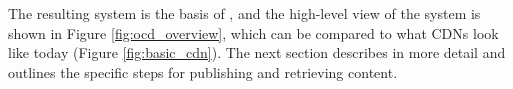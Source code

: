 The resulting system is the basis of \system{}, and the high-level view of the system is shown in Figure \ref{fig:ocd_overview}, 
which can be compared to what CDNs look like today (Figure \ref{fig:basic_cdn}).  The next section describes \system{} in more 
detail and outlines the specific steps for publishing and retrieving content.

